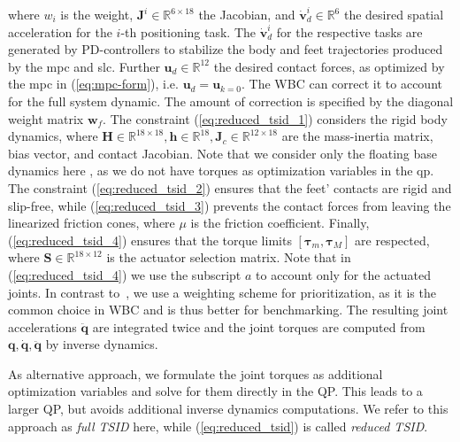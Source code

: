 where $w_i$ is the weight, $\mathbf{J}^i \in \mathbb{R}^{6 \times 18}$ the Jacobian, and $\dot{\mathbf{v}}_d^i \in \mathbb{R}^6$ the desired spatial acceleration for the $i$-th positioning task. The $\dot{\mathbf{v}}_d^i$ for the respective tasks are generated by PD-controllers to stabilize the body and feet trajectories produced by the \gls{mpc} and \gls{slc}. Further $\mathbf{u}_d \in \mathbb{R}^{12}$ the desired contact forces, as optimized by the \gls{mpc} in (\ref{eq:mpc-form}), i.e. $\mathbf{u}_d = \mathbf{u}_{k=0}$. The WBC can correct it to account for the full system dynamic. The amount of correction is specified by the diagonal weight matrix $\mathbf{w}_f$. 
The constraint (\ref{eq:reduced_tsid_1}) considers the rigid body dynamics, where $\mathbf{H} \in \mathbb{R}^{18 \times 18},\mathbf{h} \in \mathbb{R}^{18}, \mathbf{J}_{c} \in \mathbb{R}^{12 \times 18}$ are the mass-inertia matrix, bias vector, and contact Jacobian. 
Note that we consider only the floating base dynamics here %
, as we do not have torques as optimization variables in the \gls{qp}. 
The constraint (\ref{eq:reduced_tsid_2}) ensures that the feet' contacts are rigid and slip-free, while (\ref{eq:reduced_tsid_3}) prevents the contact forces from leaving the linearized friction cones, where $\mu$ is the friction coefficient. Finally, (\ref{eq:reduced_tsid_4}) ensures that the torque limits $[\boldsymbol{\tau}_m,\boldsymbol{\tau}_M]$ are respected, where $\mathbf{S}\in\mathbb{R}^{18\times12}$ is the actuator selection matrix. Note that in (\ref{eq:reduced_tsid_4}) we use the subscript $a$ to account only for the actuated joints. In contrast to~\cite{kim_highly_2019}, we use a weighting scheme for prioritization, as it is the common choice in WBC and is thus better for benchmarking. The resulting joint accelerations $\ddot{\mathbf{q}}$ are integrated twice and the joint torques are computed from $\mathbf{q},\dot{\mathbf{q}},\ddot{\mathbf{q}}$ by inverse dynamics. 

As alternative approach, we formulate the joint torques as additional optimization variables and solve for them directly in the QP. This leads to a larger QP, but avoids additional inverse dynamics computations.
We refer to this approach as \textit{full TSID} here, while (\ref{eq:reduced_tsid}) is called \textit{reduced TSID}. 

%
